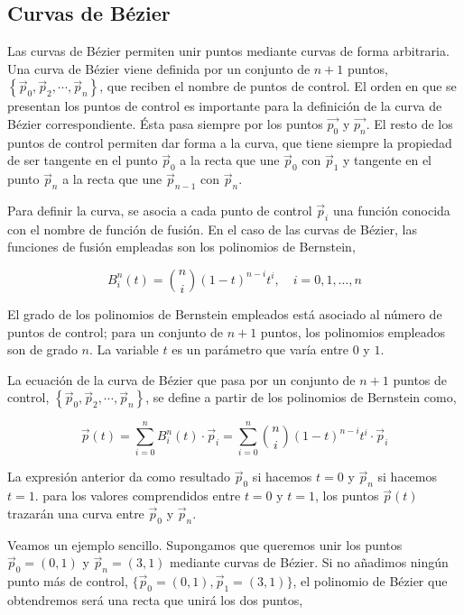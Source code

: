 \begin{paracol}{2} 
\section{Curvas de Bézier}
Las curvas de Bézier permiten unir puntos mediante curvas de forma arbitraria.  Una curva de Bézier viene definida por un conjunto de $n+1$ puntos, $\left\lbrace\vec{p}_0, \vec{p}_2, \cdots, \vec{p}_n\right\rbrace$, que reciben el nombre de puntos de control. El orden en que se presentan los puntos de control es importante para la definición de la curva de Bézier correspondiente. Ésta pasa siempre por los puntos $\vec{p_0}$ y $\vec{p_n}$. El resto de los puntos de control permiten dar forma a la curva, que tiene siempre la propiedad de ser tangente en el punto $\vec{p}_0$ a la recta que une $\vec{p}_0$ con $\vec{p}_1$ y tangente en el punto $\vec{p}_n$ a la recta que une $\vec{p}_{n-1}$ con $\vec{p}_n$.

Para definir la curva, se asocia a cada punto de control $\vec{p}_i$ una función conocida con el nombre de función de fusión. En el caso de las curvas de Bézier, las funciones de fusión empleadas son los polinomios de Bernstein, 
\end{paracol}
\begin{equation*}
B_i^n (t)=\binom{n}{i}\left(1-t\right)^{n-i}t^i, \quad i = 0, 1, \dots, n
\end{equation*}
\begin{paracol}{2}
El grado de los polinomios de Bernstein empleados está asociado al número de puntos de control; para un conjunto de $n+1$ puntos, los polinomios empleados son de grado $n$. La variable $t$ es un parámetro que varía entre $0$ y $1$.

La ecuación de la curva de Bézier que pasa por un conjunto de $n+1$ puntos de control, $\left\lbrace\vec{p}_0, \vec{p}_2, \cdots, \vec{p}_n\right\rbrace$, se define a partir de los polinomios de Bernstein como,
\end{paracol}
\begin{equation*}
\vec{p}(t) = \sum_{i = 0}^n B_i^n(t) \cdot \vec{p}_i = \sum_{i = 0}^n \binom{n}{i}\left(1-t\right)^{n-i}t^i  \cdot \vec{p}_i
\end{equation*}
\begin{paracol}{2}
La expresión anterior da como resultado $\vec{p}_0$ si hacemos $t = 0$ y $\vec{p}_n$ si hacemos $t = 1$. para los valores comprendidos entre $t=0$ y $t=1$, los puntos $\vec{p}(t)$  trazarán una curva entre $\vec{p}_0$  y $\vec{p}_n$.

Veamos un ejemplo sencillo. Supongamos que queremos unir los puntos $\vec{p}_0 = (0,1)$ y $\vec{p}_n = (3,1)$ mediante curvas de Bézier. Si no añadimos ningún punto más de control, $\lbrace\vec{p}_0 = (0,1), \vec{p}_1 = (3,1)\rbrace$, el polinomio de Bézier que obtendremos será una recta que unirá los dos puntos,
\end{paracol}
